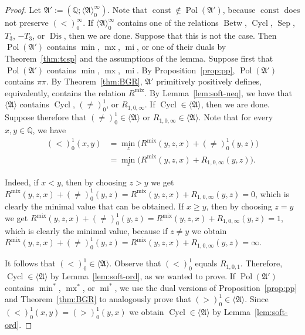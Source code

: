 \documentclass[preprint,12pt]{elsarticle}
\newcommand{\Q}{\mathbb Q}
\newcommand{\bA}{{\mathfrak A}}
\newcommand{\checked}[1]{#1}
\DeclareMathOperator{\Cyc}{Cycl}
\DeclareMathOperator{\Pol}{Pol}
\DeclareMathOperator{\mi}{mi}
\DeclareMathOperator{\lele}{ll}
\DeclareMathOperator{\mx}{mx}
\DeclareMathOperator{\lex}{lex}
\DeclareMathOperator{\mix}{mix}
\DeclareMathOperator{\const}{const}
\DeclareMathOperator{\Betw}{Betw}
\DeclareMathOperator{\Sep}{Sep}
\DeclareMathOperator{\Dis}{Dis}
\begin{document}
\begin{proof}
Let $\bA' := (\Q; \langle \bA \rangle_0^\infty)$. Note that $\const \notin \Pol(\bA')$, because $\const$ does not preserve $(<)_0^\infty$. If 
$\langle \bA \rangle_0^\infty$ contains one of the relations $\Betw$, $\Cyc$, $\Sep$, $T_3$, $-T_3$, or $\Dis$, then we are done. Suppose that this is not the case.
Then $\Pol(\bA')$ contains \checked{$\min$, $\mx$, $\mi$, or one of their duals by Theorem~\ref{thm:tcsp} and the assumptions of the lemma.} Suppose first that $\Pol(\bA')$ contains $\min$, $\mx$, $\mi$.
By Proposition~\ref{prop:pp}, $\Pol(\bA')$ contains $\pi\pi$.
By Theorem~\ref{thm:BGR}, $\bA'$ primitively positively defines, equivalently, contains the relation $R^{\mix}$. 
By Lemma~\ref{lem:soft-neq}, we have that
$\langle \bA \rangle$ contains $\Cyc$, $(\neq)_0^1$, or $R_{1,0,\infty}$. If $\Cyc \in \langle \bA \rangle$, then we are done. Suppose therefore that $(\neq)_0^1 \in \langle \bA \rangle$ or $R_{1,0,\infty} \in \langle \bA \rangle$.
Note that for every $x,y \in \Q$, we have
\begin{align*}
(<)_0^1(x,y) &= \min_z \big(R^{\mix}(y,z,x) + (\neq)_0^1(y,z) \big) \\
& = \min_z \big(R^{\mix}(y,z,x) + R_{1,0,\infty}(y,z) \big).
\end{align*}

Indeed, if $x<y$, then by choosing $z>y$ we get $R^{\mix}(y,z,x) + (\neq)_0^1(y,z) = R^{\mix}(y,z,x) + R_{1,0,\infty}(y,z) = 0$, which is clearly the minimal value that can be obtained. If $x \geq y$, then by choosing $z=y$ we get $R^{\mix}(y,z,x) + (\neq)_0^1(y,z) = R^{\mix}(y,z,x) + R_{1,0,\infty}(y,z) = 1$, which is clearly the minimal value, 
because if $z \neq y$ we obtain $R^{\mix}(y,z,x) + (\neq)_0^1(y,z) = R^{\mix}(y,z,x) + R_{1,0,\infty}(y,z) = \infty$.

It follows that $(<)_0^1 \in \langle \bA \rangle$. 
Observe that $(<)_0^1$ equals $R_{1,0,1}$. Therefore,
$\Cyc \in \langle \bA \rangle$ by Lemma~\ref{lem:soft-ord}, as we wanted to prove.
If $\Pol(\bA')$ contains $\min^*$, $\mx^*$, \checked{ or} $\mi^*$,
we use the dual versions of Proposition~\ref{prop:pp} and Theorem~\ref{thm:BGR} to analogously prove that $(>)_0^1 \in \langle \bA \rangle$. 
Since $(<)_0^1(x,y) = (>)_0^1(y,x)$ 
we obtain $\Cyc \in \langle \bA \rangle$  by Lemma~\ref{lem:soft-ord}.
\end{proof}
\end{document}
